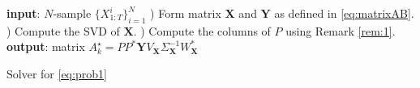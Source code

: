 \documentclass{article}
\newcommand{\Rr}{\mathds{R}}
\newcommand{\R}{P}
\newcommand{\Q}{Q}
\newcommand{\XI}{{X}}
\newcommand{\AAA}{\mathbf{X}}
\newcommand{\BBB}{\mathbf{Y}}
\newcommand{\ie}{\textit{i.e.}, }
\def\remCH#1{{\noindent\color{red}{{\footnotesize [CH: #1]}}}}
\begin{document}
\begin{algorithm}[t]
\begin{algorithmic}[0]
\State \textbf{input}: $N$-sample $\{\XI_{1:T}^i\}_{i=1}^N$%
) Form matrix $\AAA$ and $\BBB$ as defined in \eqref{eq:matrixAB}. %
) Compute the SVD of $\AAA$. %
) Compute   the columns of $\R$ using Remark \ref{rem:1}.%
\State \textbf{output}: matrix $A_k^\star =\R\R^*\BBB V_\AAA\Sigma_\AAA^{-1}W_\AAA^*$%
\end{algorithmic}
\caption{Solver for \eqref{eq:prob1} \label{algo:1}}
\end{algorithm}
\end{document}
